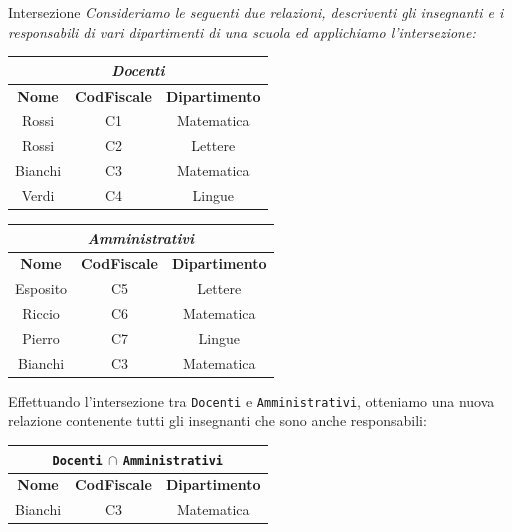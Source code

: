 \begin{Example}{Intersezione}{}
    \textit{Consideriamo le seguenti due relazioni, descriventi gli insegnanti e i responsabili di vari dipartimenti di una scuola ed applichiamo l'intersezione:}
    \begin{center}
        \begin{tabular}{|c|c|c|}
            \hline\multicolumn{3}{|c|}{\textit{Docenti}}\\\hline
            \textbf{Nome} & \textbf{CodFiscale} & \textbf{Dipartimento}\\\hline
            Rossi & C1 & Matematica\\
            Rossi & C2 & Lettere\\
            Bianchi & C3 & Matematica\\
            Verdi & C4 & Lingue\\\hline
        \end{tabular}
        \begin{tabular}{|c|c|c|}
            \hline\multicolumn{3}{|c|}{\textit{Amministrativi}}\\\hline
            \textbf{Nome} & \textbf{CodFiscale} & \textbf{Dipartimento}\\\hline
            Esposito & C5 & Lettere\\
            Riccio & C6 & Matematica\\
            Pierro & C7 & Lingue\\
            Bianchi & C3 & Matematica\\\hline
        \end{tabular}
        \bigskip
    \end{center}
    Effettuando l'intersezione tra \verb|Docenti| e \verb|Amministrativi|, otteniamo una nuova relazione contenente tutti gli insegnanti che sono anche responsabili:

    \begin{center}
        \begin{tabular}{|c|c|c|}
            \hline\multicolumn{3}{|c|}{\Verb|Docenti| $\cap$ \Verb|Amministrativi|}\\\hline
            \textbf{Nome} & \textbf{CodFiscale} & \textbf{Dipartimento}\\\hline
            Bianchi & C3 & Matematica\\\hline
        \end{tabular}
    \end{center}
\end{Example}

